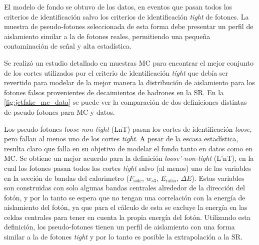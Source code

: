 El modelo de fondo se obtuvo de los datos, en eventos que pasan todos los
criterios de identificación salvo los criterios de identificación \emph{tight}
de fotones. La muestra de pseudo-fotones seleccionada de esta forma debe
presentar un perfil de aislamiento similar a la de fotones reales, permitiendo
una pequeña contaminación de señal y alta estadística.

Se realizó un estudio detallado en muestras MC para encontrar el mejor conjunto
de los cortes utilizados por el criterio de identificación \emph{tight} que debía ser
revertido para modelar de la mejor manera la distribución de aislamiento para
los fotones falsos provenientes de decaimientos de hadrones en la SR. En la
\cref{fig:jetfake_mc_data} se puede ver la comparación de dos definiciones
distintas de pseudo-fotones para MC y datos.



Los pseudo-fotones \emph{loose-non-tight} (LnT) pasan los cortes de
identificación \emph{loose}, pero fallan al menos uno de los cortes
\emph{tight}. A pesar de la escasa estadística, resulta claro que falla en su
objetivo de modelar el fondo tanto en datos como en MC. Se obtiene un mejor
acuerdo para la definición \emph{loose'-non-tight} (L'nT), en la cual los
fotones pasan todos los cortes \emph{tight} salvo (al menos) uno de las
variables en la sección de bandas del calorimetro ($F_\text{side}$, $w_{s3}$, $E_\text{ratio}$,
$\Delta E$). Estas variables son construidas con solo algunas bandas centrales
alrededor de la dirección del fotón, y por lo tanto se espera que no tengan una
correlación con la energía de aislamiento del fotón, ya que para el cálculo de
esta se excluye la energía en las celdas centrales para tener en cuenta la
propia energía del fotón. Utilizando esta definición, los pseudo-fotones tienen
un perfil de aislamiento con una forma similar a la de fotones \emph{tight} y
por lo tanto es posible la extrapolación a la SR.

